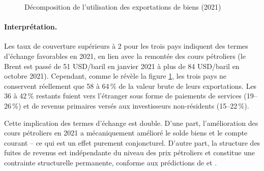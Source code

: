 \documentclass[12pt,a4paper]{article}
\begin{document}
\begin{figure}[h!]
  \centering
  \caption{Décomposition de l'utilisation des exportations de biens (2021)}
  \label{fig:retention}
\end{figure}

\paragraph{Interprétation.}
Les taux de couverture supérieurs à 2 pour les trois pays indiquent des termes d'échange
favorables en 2021, en lien avec la remontée des cours pétroliers (le Brent est passé de
51 USD/baril en janvier 2021 à plus de 84 USD/baril en octobre 2021). Cependant, comme le
révèle la figure \ref{fig:retention}, les trois pays ne conservent réellement que 58 à 64\,\%
de la valeur brute de leurs exportations. Les 36 à 42\,\% restants fuient vers l'étranger
sous forme de paiements de services (19--26\,\%) et de revenus primaires versés aux
investisseurs non-résidents (15--22\,\%).

Cette implication des termes d'échange est double. D'une part, l'amélioration des cours
pétroliers en 2021 a mécaniquement amélioré le solde biens et le compte courant -- ce qui
est un effet purement conjoncturel. D'autre part, la structure des fuites de revenus est
indépendante du niveau des prix pétroliers et constitue une contrainte structurelle permanente,
conforme aux prédictions de \textcite{cordenneary1982} et \textcite{sachswarner1995}.
\end{document}
